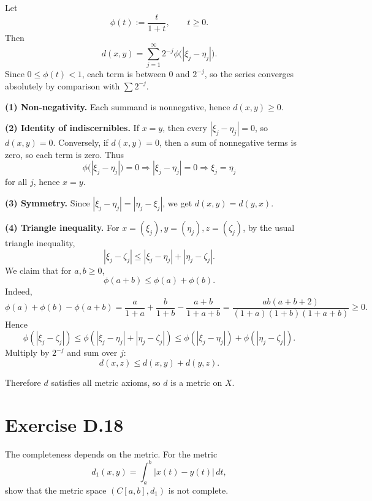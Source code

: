 \documentclass{article}
\begin{document}
\begin{solution}
  Let
  \[
    \phi(t):=\frac{t}{1+t},\qquad t\ge 0.
  \]
  Then
  \[
    d(x,y)=\sum_{j=1}^{\infty}2^{-j}\phi\big(|\xi_j-\eta_j|\big).
  \]
  Since $0\le \phi(t)<1$, each term is between $0$ and $2^{-j}$, so the
  series converges absolutely by comparison with $\sum 2^{-j}$.

  \textbf{(1) Non-negativity.} Each summand is nonnegative, hence
  $d(x,y)\ge 0$.

  \textbf{(2) Identity of indiscernibles.}
  If $x=y$, then every $|\xi_j-\eta_j|=0$, so $d(x,y)=0$.
  Conversely, if $d(x,y)=0$, then a sum of nonnegative terms is zero, so each
  term is zero. Thus
  \[
    \phi\big(|\xi_j-\eta_j|\big)=0 \Rightarrow |\xi_j-\eta_j|=0
    \Rightarrow \xi_j=\eta_j
  \]
  for all $j$, hence $x=y$.

  \textbf{(3) Symmetry.} Since $|\xi_j-\eta_j|=|\eta_j-\xi_j|$, we get
  $d(x,y)=d(y,x)$.

  \textbf{(4) Triangle inequality.}
  For $x=(\xi_j), y=(\eta_j), z=(\zeta_j)$, by the usual triangle inequality,
  \[
    |\xi_j-\zeta_j|\le |\xi_j-\eta_j|+|\eta_j-\zeta_j|.
  \]
  We claim that for $a,b\ge 0$,
  \[
    \phi(a+b)\le \phi(a)+\phi(b).
  \]
  Indeed,
  \[
    \phi(a)+\phi(b)-\phi(a+b)
    = \frac{a}{1+a}+\frac{b}{1+b}-\frac{a+b}{1+a+b}
    = \frac{ab(a+b+2)}{(1+a)(1+b)(1+a+b)}\ge 0.
  \]
  Hence
  \[
    \phi(|\xi_j-\zeta_j|)
    \le \phi(|\xi_j-\eta_j|+|\eta_j-\zeta_j|)
    \le \phi(|\xi_j-\eta_j|)+\phi(|\eta_j-\zeta_j|).
  \]
  Multiply by $2^{-j}$ and sum over $j$:
  \[
    d(x,z)\le d(x,y)+d(y,z).
  \]

  Therefore $d$ satisfies all metric axioms, so $d$ is a metric on $X$.
\end{solution}

\section{Exercise D.18}

The completeness depends on the metric. For the metric
\[
  d_1(x,y)=\int_a^b |x(t)-y(t)|\,dt,
\]
show that the metric space $(C[a,b], d_1)$ is not complete.
\end{document}

